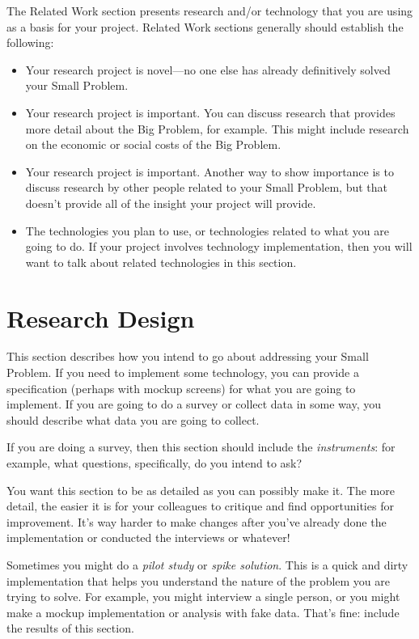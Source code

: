 \documentclass[english]{proposalnsf}
\begin{document}
The Related Work section presents research and/or technology that you are using as a basis for your project.  Related Work sections generally should establish the following:

\begin{itemize}
\item Your research project is novel---no one else has already definitively solved your Small Problem.
\item Your research project is important. You can discuss research that provides more detail about the Big Problem, for example. This might include research on the economic or social costs of the Big Problem.
\item Your research project is important.  Another way to show importance is to discuss research by other people related to your Small Problem, but that doesn't provide all of the insight your project will provide.
\item The technologies you plan to use, or technologies related to what you are going to do. If your project involves technology implementation, then you will want to talk about related technologies in this section.
\end{itemize}

\section{Research Design}
\label{research-design}

This section describes how you intend to go about addressing your Small Problem.  If you need to implement some technology, you can provide a specification (perhaps with mockup screens) for what you are going to implement. If you are going to do a survey or collect data in some way, you should describe what data you are going to collect.

If you are doing a survey, then this section should include the {\em instruments}:  for example, what questions, specifically, do you intend to ask?

You want this section to be as detailed as you can possibly make it.  The more detail, the easier it is for your colleagues to critique and find opportunities for improvement.   It's way harder to make changes after you've already done the implementation or conducted the interviews or whatever!

Sometimes you might do a {\em pilot study} or {\em spike solution}.  This is a quick and dirty implementation that helps you understand the nature of the problem you are trying to solve.  For example, you might interview a single person, or you might make a mockup implementation or analysis with fake data.  That's fine: include the results of this section.
\end{document}
